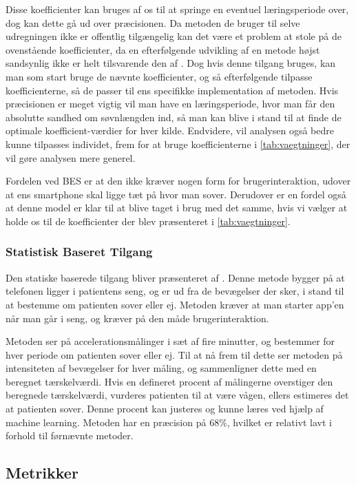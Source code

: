 Disse koefficienter kan bruges af os til at springe en eventuel læringsperiode over, dog kan dette gå ud over præcisionen. 
Da metoden de bruger til selve udregningen ikke er offentlig tilgængelig kan det være et problem at stole på de ovenstående koefficienter, da en efterfølgende udvikling af en metode højst sandsynlig ikke er helt tilsvarende den af \citet{6563918}.
Dog hvis denne tilgang bruges, kan man som start bruge de nævnte koefficienter, og så efterfølgende tilpasse koefficienterne, så de passer til ens specifikke implementation af metoden.
Hvis præcisionen er meget vigtig vil man have en læringsperiode, hvor man får den absolutte sandhed om søvnlængden ind, så man kan blive i stand til at finde de optimale koefficient-værdier for hver kilde.
Endvidere, vil analysen også bedre kunne tilpasses individet, frem for at bruge koefficienterne i \cref{tab:vaegtninger}, der vil gøre analysen mere generel.

Fordelen ved BES er at den ikke kræver nogen form for brugerinteraktion, udover at ens smartphone skal ligge tæt på hvor man sover.
Derudover er en fordel også at denne model er klar til at blive taget i brug med det samme, hvis vi vælger at holde os til de koefficienter der blev præsenteret i \cref{tab:vaegtninger}.

\subsubsection{Statistisk Baseret Tilgang}\label{sec:statbased}
Den statiske baserede tilgang bliver præsenteret af \citet{misc:statbased}.
Denne metode bygger på at telefonen ligger i patientens seng, og er ud fra de bevægelser der sker, i stand til at bestemme om patienten sover eller ej. 
Metoden kræver at man starter app'en når man går i seng, og kræver på den måde brugerinteraktion.

Metoden ser på accelerationsmålinger i sæt af fire minutter, og bestemmer for hver periode om patienten sover eller ej.
Til at nå frem til dette ser metoden på intensiteten af bevægelser for hver måling, og sammenligner dette med en beregnet tærskelværdi.
Hvis en defineret procent af målingerne overstiger den beregnede tærskelværdi, vurderes patienten til at være vågen, ellers estimeres det at patienten sover.
Denne procent kan justeres og kunne læres ved hjælp af machine learning.
Metoden har en præcision på 68\%, hvilket er relativt lavt i forhold til førnævnte metoder.

\subsection{Metrikker}\label{sec:metrikker}
